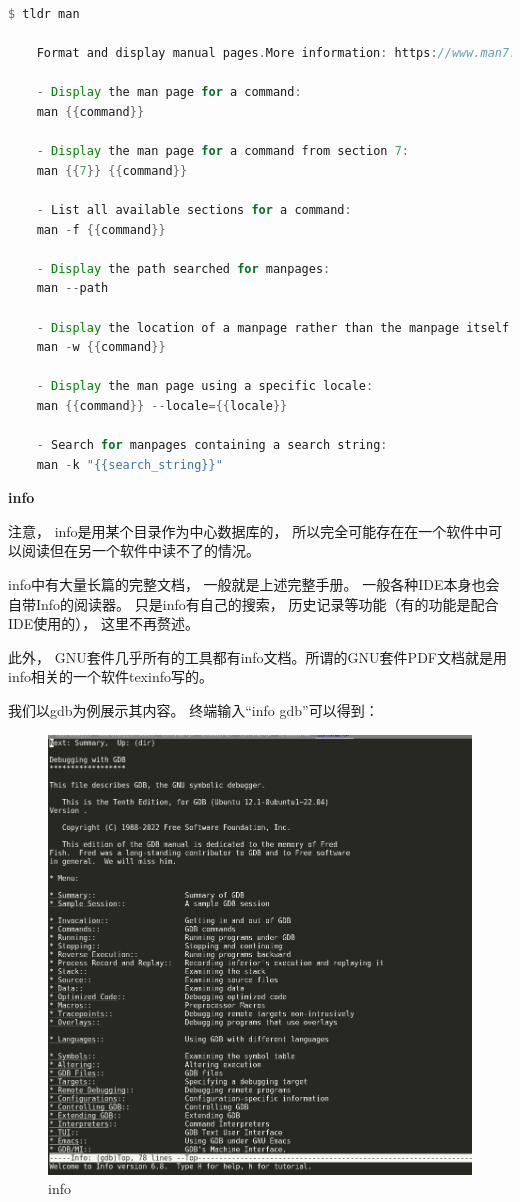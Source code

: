 \begin{lstlisting}[language={Rust}, label={code:forktest},
	caption={forktest.rs}]
	$ tldr man
	
	Format and display manual pages.More information: https://www.man7.org/linux/man-pages/man1/man.1.html.
	
	- Display the man page for a command:
	man {{command}}
	
	- Display the man page for a command from section 7:
	man {{7}} {{command}}
	
	- List all available sections for a command:
	man -f {{command}}
	
	- Display the path searched for manpages:
	man --path
	
	- Display the location of a manpage rather than the manpage itself:
	man -w {{command}}
	
	- Display the man page using a specific locale:
	man {{command}} --locale={{locale}}
	
	- Search for manpages containing a search string:
	man -k "{{search_string}}"
\end{lstlisting}

\textbf{info}

注意， info是用某个目录作为中心数据库的， 所以完全可能存在在一个软件中可以阅读但在另一个软件中读不了的情况。

info中有大量长篇的完整文档， 一般就是上述完整手册。 一般各种IDE本身也会自带Info的阅读器。 只是info有自己的搜索， 历史记录等功能（有的功能是配合IDE使用的）， 这里不再赘述。

此外， GNU套件几乎所有的工具都有info文档。所谓的GNU套件PDF文档就是用info相关的一个软件texinfo写的。

我们以gdb为例展示其内容。 终端输入“info gdb”可以得到：

\begin{figure}[htb]
	\centering
	\includegraphics[width=\textwidth]{figures/02-01-info.png}
	\caption{
		info
	}
	\label{fig:info}
\end{figure}

